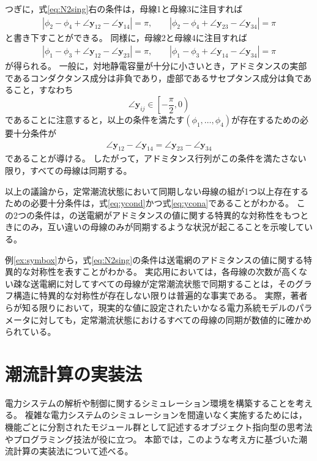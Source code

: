 \documentclass[tombow,dvipdfmx]{corona-a5-1.1}
\begin{document}
\begin{例}
つぎに，式\ref{eq:N2sing}右の条件は，母線1と母線3に注目すれば
\begin{align*}
|\phi_2 - \phi_4 + \angle \bm{y}_{12} - \angle \bm{y}_{14}|=\pi
,\qquad
|\phi_2 - \phi_4 + \angle \bm{y}_{23} - \angle \bm{y}_{34}|=\pi
\end{align*}
と書き下すことができる。
同様に，母線2と母線4に注目すれば
\begin{align*}
|\phi_1 - \phi_3 + \angle \bm{y}_{12} - \angle \bm{y}_{23}|=\pi
,\qquad
|\phi_1 - \phi_3 + \angle \bm{y}_{14} - \angle \bm{y}_{34}|=\pi
\end{align*}
が得られる。
一般に，対地静電容量が十分に小さいとき，アドミタンスの実部であるコンダクタンス成分は非負であり，虚部であるサセプタンス成分は負であること，すなわち
\[
\angle \bm{y}_{ij} \in \left[-\frac{\pi}{2},0 \right)
\]
であることに注意すると，以上の条件を満たす$(\phi_1,\ldots,\phi_4)$が存在するための必要十分条件が
\begin{align}\label{eq:ycona}
\angle \bm{y}_{12} - \angle \bm{y}_{14}=
\angle \bm{y}_{23} - \angle \bm{y}_{34}
\end{align}
であることが導ける。
したがって，アドミタンス行列がこの条件を満たさない限り，すべての母線は同期する。

以上の議論から，定常潮流状態において同期しない母線の組が1つ以上存在するための必要十分条件は，式\ref{eq:ycond}かつ式\ref{eq:ycona}であることがわかる。
この2つの条件は，の送電網がアドミタンスの値に関する特異的な対称性をもつときにのみ，互い違いの母線のみが同期するような状況が起こることを示唆している。
\end{例}

例\ref{ex:symbox}から，式\ref{eq:N2sing}の条件は送電網のアドミタンスの値に関する特異的な対称性を表すことがわかる。
実応用においては，各母線の次数が高くない疎な送電網に対してすべての母線が定常潮流状態で同期することは，そのグラフ構造に特異的な対称性が存在しない限りは普遍的な事実である。
実際，著者らが知る限りにおいて，現実的な値に設定されたいかなる電力系統モデルのパラメータに対しても，定常潮流状態におけるすべての母線の同期が数値的に確かめられている。

\section{潮流計算の実装法}
電力システムの解析や制御に関するシミュレーション環境を構築することを考える。
複雑な電力システムのシミュレーションを間違いなく実施するためには，
機能ごとに分割されたモジュール群として記述するオブジェクト指向型の思考法やプログラミング技法が役に立つ。
本節では，このような考え方に基づいた潮流計算の実装法について述べる。
\end{document}
